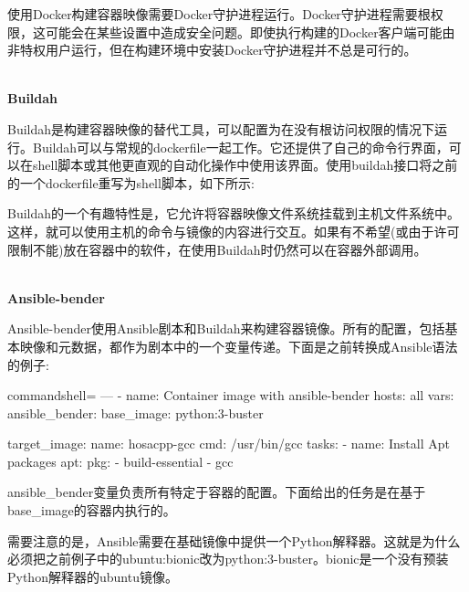 
使用Docker构建容器映像需要Docker守护进程运行。Docker守护进程需要根权限，这可能会在某些设置中造成安全问题。即使执行构建的Docker客户端可能由非特权用户运行，但在构建环境中安装Docker守护进程并不总是可行的。

\hspace*{\fill} \\ %
\noindent
\textbf{Buildah}

Buildah是构建容器映像的替代工具，可以配置为在没有根访问权限的情况下运行。Buildah可以与常规的dockerfile一起工作。它还提供了自己的命令行界面，可以在shell脚本或其他更直观的自动化操作中使用该界面。使用buildah接口将之前的一个dockerfile重写为shell脚本，如下所示:


Buildah的一个有趣特性是，它允许将容器映像文件系统挂载到主机文件系统中。这样，就可以使用主机的命令与镜像的内容进行交互。如果有不希望(或由于许可限制不能)放在容器中的软件，在使用Buildah时仍然可以在容器外部调用。

\hspace*{\fill} \\ %
\noindent
\textbf{Ansible-bender}

Ansible-bender使用Ansible剧本和Buildah来构建容器镜像。所有的配置，包括基本映像和元数据，都作为剧本中的一个变量传递。下面是之前转换成Ansible语法的例子:

\begin{tcblisting}{commandshell={}}
---
- name: Container image with ansible-bender
  hosts: all
  vars:
    ansible_bender:
      base_image: python:3-buster
    
      target_image:
        name: hosacpp-gcc
        cmd: /usr/bin/gcc
tasks:
- name: Install Apt packages
  apt:
    pkg:
      - build-essential
      - gcc
\end{tcblisting}

ansible\_bender变量负责所有特定于容器的配置。下面给出的任务是在基于base\_image的容器内执行的。

需要注意的是，Ansible需要在基础镜像中提供一个Python解释器。这就是为什么必须把之前例子中的ubuntu:bionic改为python:3-buster。bionic是一个没有预装Python解释器的ubuntu镜像。

